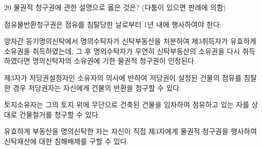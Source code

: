 \begin{question}{20}
물권적 청구권에 관한 설명으로 옳은 것은? (다툼이 있으면 판례에 의함)
\begin{choices}
  \item 점유물반환청구권은 점유를 침탈당한 날로부터 1년 내에 행사하여야 한다.
  \item 양자간 등기명의신탁에서 명의수탁자가 신탁부동산을 처분하여 제3취득자가 유효하게 소유권을 취득하였는데, 그 후 명의수탁자가 우연히 신탁부동산의 소유권을 다시 취득하였다면 명의신탁자의 소유권에 기한 물권적 청구권이 인정된다.
  \item 제3자가 저당권설정자인 소유자의 의사에 반하여 저당권이 설정된 건물의 점유를 침탈한 경우 저당권자는 자신에게 건물의 반환을 청구할 수 있다.
  \item 토지소유자는 그의 토지 위에 무단으로 건축된 건물을 임차하여 점유하고 있는 자를 상대로 건물철거를 청구할 수 있다.
  \item 유효하게 부동산을 명의신탁한 자는 자신이 직접 제3자에게 물권적 청구권을 행사하여 신탁재산에 대한 침해배제를 구할 수 있다.
\end{choices}
\end{question}
